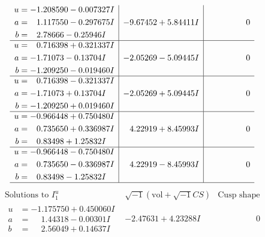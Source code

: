 \documentclass[1p]{elsarticle_modified}
\theoremstyle{definition}
\newcommand{\I}{\sqrt{-1}}
\begin{document}
$$\begin{array}{c|c|c}
\begin{aligned}
u &= -1.208590 - 0.007327 I \\
a &= \phantom{-}1.117550 - 0.297675 I \\
b &= \phantom{-}2.78666 - 0.25946 I\end{aligned}
 & -9.67452 + 5.84411 I & \phantom{-0.000000 } 0 \\ \hline\begin{aligned}
u &= \phantom{-}0.716398 + 0.321337 I \\
a &= -1.71073 - 0.13704 I \\
b &= -1.209250 - 0.019460 I\end{aligned}
 & -2.05269 - 5.09445 I & \phantom{-0.000000 } 0 \\ \hline\begin{aligned}
u &= \phantom{-}0.716398 - 0.321337 I \\
a &= -1.71073 + 0.13704 I \\
b &= -1.209250 + 0.019460 I\end{aligned}
 & -2.05269 + 5.09445 I & \phantom{-0.000000 } 0 \\ \hline\begin{aligned}
u &= -0.966448 + 0.750480 I \\
a &= \phantom{-}0.735650 + 0.336987 I \\
b &= \phantom{-}0.83498 + 1.25832 I\end{aligned}
 & \phantom{-}4.22919 + 8.45993 I & \phantom{-0.000000 } 0 \\ \hline\begin{aligned}
u &= -0.966448 - 0.750480 I \\
a &= \phantom{-}0.735650 - 0.336987 I \\
b &= \phantom{-}0.83498 - 1.25832 I\end{aligned}
 & \phantom{-}4.22919 - 8.45993 I & \phantom{-0.000000 } 0\\
 \hline 
 \end{array}$$\newpage$$\begin{array}{c|c|c}  
\text{Solutions to }I^u_{1}& \I (\text{vol} + \sqrt{-1}CS) & \text{Cusp shape}\\
 \hline 
\begin{aligned}
u &= -1.175750 + 0.450060 I \\
a &= \phantom{-}1.44318 - 0.00301 I \\
b &= \phantom{-}2.56049 + 0.14637 I\end{aligned}
 & -2.47631 + 4.23288 I & \phantom{-0.000000 } 0 \\ \hline\begin{aligned}

\end{aligned}
\end{array}$$
\end{document}
